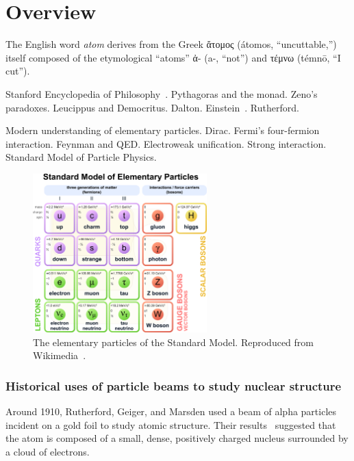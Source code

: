 \section{Overview}

The English word \textit{atom} derives from the Greek
\textgreek{ἄτομος} (átomos, ``uncuttable,'')
itself composed of the etymological ``atoms''
\textgreek{ἀ}- (a-, ``not'')
and
\textgreek{τέμνω } (témnō, ``I cut'').

Stanford Encyclopedia of Philosophy~\cite{sep-atomism-ancient}.
Pythagoras and the monad.
Zeno's paradoxes.
Leucippus and Democritus.
Dalton.
Einstein~\cite{aps_einstein_brownian}.
Rutherford.


Modern understanding of elementary particles.
Dirac.
Fermi's four-fermion interaction.
Feynman and QED.
Electroweak unification.
Strong interaction.
Standard Model of Particle Physics.

\begin{figure}[!h]
    \centering
    \includegraphics[width=0.6\textwidth]{chap1/Standard_Model_of_Elementary_Particles.pdf}
    \caption{The elementary particles of the Standard Model. Reproduced from
             Wikimedia~\cite{standard_model_wikimedia}.
            }
    \label{fig:Standard_Model_of_Elementary_Particles}
\end{figure}

\subsubsection{Historical uses of particle beams to study nuclear structure}
Around 1910, Rutherford, Geiger, and Marsden used a beam of alpha particles
incident on a gold foil to study atomic structure.
Their results~\cite{Rutherford_1911} suggested that the atom is composed of a
small, dense, positively charged nucleus surrounded by a cloud of electrons.

